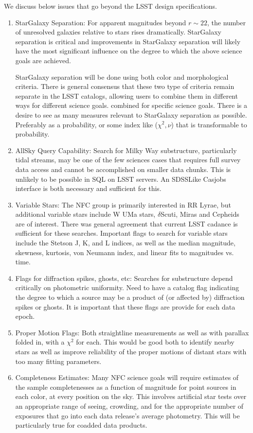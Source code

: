 We discuss below issues that go beyond the LSST design specifications. 
\begin{enumerate}
\item{StarGalaxy Separation: For apparent magnitudes beyond $r\sim22$, the number of unresolved
 galaxies relative to stars rises dramatically. StarGalaxy separation is critical and 
improvements in StarGalaxy separation will likely have 
the most significant influence on the degree to which the above
 science goals are achieved. 

StarGalaxy separation will be done using both color and morphological criteria. 
There is general consensus that these two type of criteria remain separate in the 
LSST catalogs, allowing users to combine them in different ways for different science goals. 
combined for specific science goals. There is a desire to see as many measures relevant to
StarGalaxy separation as possible. Preferably as a probability, or some index like ($\chi^2, \nu$)
 that is transformable to probability. }

\item{AllSky Query Capability: Search for Milky Way substructure, particularly tidal streams, 
may be one of the few sciences cases that requires full survey data access and cannot be 
accomplished on smaller data chunks. This is unlikely to be possible in SQL on LSST servers. 
An SDSSLike Casjobs interface is both necessary and sufficient for this. }

\item{Variable Stars: The NFC group is primarily interested in RR Lyrae, but additional variable 
stars include W UMa stars, $\delta$Scuti, Miras and Cepheids are of interest. 
There was general agreement that current LSST cadance is sufficient for these searches.
 Important flags to search for variable stars include the Stetson J, K, and L indices, as well as the
 median magnitude, skewness, kurtosis, von Neumann index, and linear fits to magnitudes vs. time.}

\item{Flags for diffraction spikes, ghosts, etc: 
Searches for substructure depend critically on photometric uniformity. 
Need to have a catalog flag indicating the degree to which a source may be a 
product of (or affected by) diffraction spikes or ghosts. 
It is important that these flags are provide for each data epoch.}

\item{Proper Motion Flags: 
Both straightline measurements as well as with parallax folded in, with a 
$\chi^2$ for each. 
This would be good both to identify nearby stars as well as improve 
reliability of the proper motions of distant stars with too many fitting parameters. }

\item{Completeness Estimates: Many NFC science goals will require estimates of the sample
 completenesses as a function of magnitude for point sources in each color, at every position on the sky.
 This involves artificial star tests over an appropriate range of seeing, crowding, 
and for the appropriate number of exposures that go into each data release's average 
photometry. This will be particularly true for coadded data products.}
\end{enumerate}

